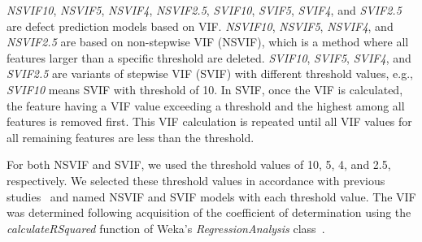 \emph{NSVIF10}, \emph{NSVIF5}, \emph{NSVIF4}, \emph{NSVIF2.5}, \emph{SVIF10}, \emph{SVIF5}, \emph{SVIF4}, and \emph{SVIF2.5} are defect prediction models based on VIF.
\emph{NSVIF10}, \emph{NSVIF5}, \emph{NSVIF4}, and \emph{NSVIF2.5} are based on non-stepwise VIF (NSVIF),
which is a method where all features larger than a specific threshold are deleted.
\emph{SVIF10}, \emph{SVIF5}, \emph{SVIF4}, and \emph{SVIF2.5} are variants of stepwise VIF (SVIF) 
with different threshold values, e.g., \emph{SVIF10} means SVIF with threshold of 10.  
In SVIF, once the VIF is calculated, the feature having a VIF value exceeding a threshold and the highest among all features is removed first. This VIF calculation is repeated until all VIF values for all remaining features are less than the threshold.

For both NSVIF and SVIF, we used the threshold values of 10, 5, 4, and 2.5, respectively. We selected these threshold values in accordance with previous studies~\cite{Bettenburg2013EMSEinteractions,Shihab2011FSEhighimpact,YangTSE2015cohesion,Bettenburg2015EMSElocallyglobally,Palomba2017TSEsmell} and named NSVIF and SVIF models with each threshold value. The VIF was determined following acquisition of the coefficient of determination using the \emph{calculateRSquared} function of Weka's \emph{RegressionAnalysis} class~\cite{Hall2009WDMWEKA}. 
 
